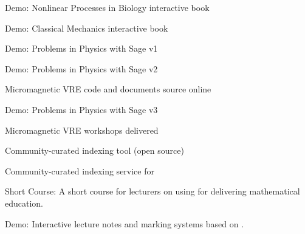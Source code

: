 \begin{workpackage}
\begin{wpdelivs}
 \begin{wpdeliv}[due=36,id=ibook2,dissem=PU,nature=DEM]{Demo: Nonlinear Processes in Biology  interactive book} \end{wpdeliv}


 \begin{wpdeliv}[due=40,id=ibook2,dissem=PU,nature=DEM]{Demo: Classical Mechanics interactive book} \end{wpdeliv}

 \begin{wpdeliv}[due=12,id=ibook3a,dissem=PU,nature=DEM]{Demo: Problems in Physics with Sage v1} \end{wpdeliv}
 \begin{wpdeliv}[due=30,id=ibook3b,dissem=PU,nature=DEM]{Demo: Problems in Physics with Sage v2} \end{wpdeliv}
 \begin{wpdeliv}[due=32,id=oommfnb-source-and-testing-setup,dissem=PU,nature=DEC,lead=USO]{Micromagnetic
     VRE code and documents source online} \end{wpdeliv}
 \begin{wpdeliv}[due=44,id=ibook3c,dissem=PU,nature=DEM]{Demo: Problems in Physics with Sage v3} \end{wpdeliv}
 \begin{wpdeliv}[due=44,id=oommfnb-workshops,dissem=PU,nature=OTHER,lead=USO]{Micromagnetic
     VRE workshops delivered} \end{wpdeliv}
 \begin{wpdeliv}[due=24,id=ils-tool,dissem=PU,nature=P]{Community-curated
     indexing tool (open source)} \end{wpdeliv}
 \begin{wpdeliv}[due=24,id=ils-service,dissem=PU,nature=DEM]{Community-curated
     indexing service for \TheProject} \end{wpdeliv}
 \begin{wpdeliv}[due=18,id=short-course,dissem=PU,nature=DEC]{Short Course: A short course for lecturers on using \TheProject for delivering mathematical education.}\end{wpdeliv}
 \begin{wpdeliv}[due=36,id=lecture-notes,dissem=PU,nature=DEM]{Demo: Interactive lecture notes and marking systems based on \TheProject.}\end{wpdeliv}


\end{wpdelivs}


\end{workpackage}

